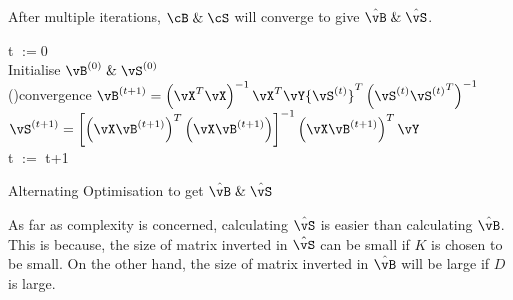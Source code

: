 \documentclass[a4paper,12pt]{article}
\begin{document}
\begin{mlsolution}
After multiple iterations, $\cB\;\&\;\cS$ will converge to give $\hat{\vB}\;\&\;\hat{\vS}$.\\

\begin{algorithm}[H]
    \DontPrintSemicolon
    \SetAlgoLined
    t $:=0$ \\
    Initialise $\vB^{(0)}\;\&\;\vS^{(0)}$ \\
    \Repeat(){convergence}{
        $\vB^{(t+1)} = \br{\vX^T\vX}^{-1}\vX^T\vY{\vS^{(t)}}^T\br{\vS^{(t)}{\vS^{(t)}}^T}^{-1}$\\
        $\vS^{(t+1)} = \bs{\br{\vX\vB^{(t+1)}}^T\br{\vX\vB^{(t+1)}}}^{-1}\br{\vX\vB^{(t+1)}}^T\vY$\\
        t $:=$ t+1
    }
    \caption{Alternating Optimisation to get $\hat{\vB}\;\&\;\hat{\vS}$}
\end{algorithm}

\bigskip As far as complexity is concerned, calculating $\hat{\vS}$ is easier than calculating $\hat{\vB}$. This is because, the size of matrix inverted in $\hat{\vS}$ can be small if $K$ is chosen to be small. On the other hand, the size of matrix inverted in $\hat{\vB}$ will be large if $D$ is large.

\end{mlsolution}
\end{document}
